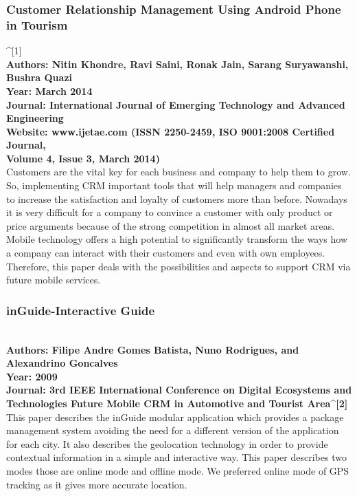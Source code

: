 \documentclass[12pt,a4paper]{article}
\begin{document}
\subsubsection{Customer Relationship Management Using Android Phone in Tourism}^{[1]}
\\
\textbf{Authors:	Nitin Khondre, Ravi Saini, Ronak Jain, 
Sarang Suryawanshi, Bushra Quazi
\\
Year:		March 2014
\\
Journal: 	International Journal of Emerging Technology and Advanced Engineering
\\
\textbf{Website: www.ijetae.com (ISSN 2250-2459, ISO 9001:2008 Certified Journal, 
\\
Volume 4, Issue 3, March 2014)}
}
\\
\hspace{0.7 cm}Customers are the vital key for each business and company to help them to grow. So, implementing
CRM important tools that will help managers and companies to increase the satisfaction and loyalty of customers more than before. Nowadays it is very difficult for a company to
 convince a customer with only product or price arguments because of the strong competition in almost all market areas. Mobile technology offers a high potential to significantly transform the ways how a company can interact
  with their customers and even with own employees. Therefore, this paper deals with the possibilities and aspects to support CRM via future mobile services.
\\

\subsubsection{inGuide-Interactive Guide}
\\
\textbf{Authors: 	Filipe Andre Gomes Batista, Nuno Rodrigues, and Alexandrino Goncalves
\\
Year: 		2009
\\
Journal:  3rd IEEE International Conference on Digital Ecosystems and Technologies Future Mobile CRM in Automotive and Tourist Area^{[2]}
}
\\
\hspace{0.7 cm}This paper describes the inGuide modular application which provides a package management system avoiding the need for a different version of the application for each city. It also describes the geolocation technology in order to provide contextual information in a simple and interactive way. This paper describes two modes those are online mode and offline mode. We preferred online mode of GPS tracking as it gives more accurate location.  
\\
\end{document}
